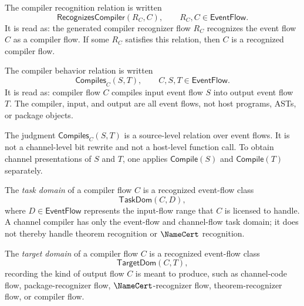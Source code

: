 \begin{definition}
\label{def:self-hosting-compiler-recognition-relation}
The compiler recognition relation is written
$$
  \mathsf{RecognizesCompiler}(R_C,C),
  \qquad
  R_C,C\in\mathsf{EventFlow}.
$$
It is read as: the generated compiler recognizer flow $R_C$ recognizes the event flow $C$ as a compiler flow. If some $R_C$ satisfies this relation, then $C$ is a recognized compiler flow.
\end{definition}

\begin{definition}
\label{def:self-hosting-compiler-behavior-relation}
The compiler behavior relation is written
$$
  \mathsf{Compiles}_C(S,T),
  \qquad
  C,S,T\in\mathsf{EventFlow}.
$$
It is read as: compiler flow $C$ compiles input event flow $S$ into output event flow $T$. The compiler, input, and output are all event flows, not host programs, ASTs, or package objects.
\end{definition}

\begin{remark}
\label{rem:self-hosting-compiler-behavior-source-level}
The judgment $\mathsf{Compiles}_C(S,T)$ is a source-level relation over event flows. It is not a channel-level bit rewrite and not a host-level function call. To obtain channel presentations of $S$ and $T$, one applies $\mathsf{Compile}(S)$ and $\mathsf{Compile}(T)$ separately.
\end{remark}

\begin{definition}
\label{def:self-hosting-compiler-task-domain}
The \emph{task domain} of a compiler flow $C$ is a recognized event-flow class
$$
  \mathsf{TaskDom}(C,D),
$$
where $D\in\mathsf{EventFlow}$ represents the input-flow range that $C$ is licensed to handle. A channel compiler has only the event-flow and channel-flow task domain; it does not thereby handle theorem recognition or $\NameCert$ recognition.
\end{definition}

\begin{definition}
\label{def:self-hosting-compiler-target-domain}
The \emph{target domain} of a compiler flow $C$ is a recognized event-flow class
$$
  \mathsf{TargetDom}(C,T),
$$
recording the kind of output flow $C$ is meant to produce, such as channel-code flow, package-recognizer flow, $\NameCert$-recognizer flow, theorem-recognizer flow, or compiler flow.
\end{definition}

